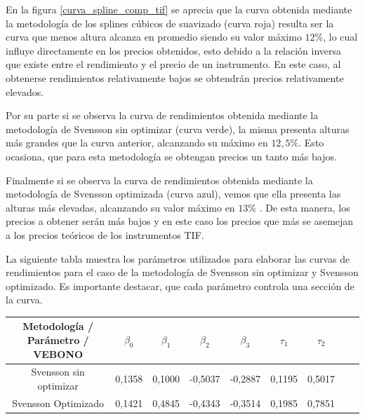 \hspace{0.4cm} En la figura \ref{curva_spline_comp_tif} se aprecia que la curva obtenida mediante la metodolog\'ia de los splines c\'ubicos de suavizado (curva roja) resulta ser la curva que menos altura alcanza en promedio siendo su valor m\'aximo $12 \%$, lo cual influye directamente en los precios obtenidos, esto debido a la relaci\'on inversa que existe entre el rendimiento y el precio de un instrumento. En este caso, al obtenerse rendimientos relativamente bajos se obtendr\'an precios relativamente elevados. 

\hspace{0.4cm} Por su parte si se observa la curva de rendimientos obtenida mediante la metodolog\'ia de Svensson sin optimizar (curva verde), la misma presenta alturas m\'as grandes que la curva anterior, alcanzando su m\'aximo en $12,5 \%$. Esto ocasiona, que para esta metodolog\'ia se obtengan precios un tanto m\'as bajos.

\hspace{0.4cm} Finalmente si se observa la curva de rendimientos obtenida mediante la metodolog\'ia de Svensson optimizada (curva azul), vemos que ella presenta las alturas m\'as elevadas, alcanzando su valor m\'aximo en $13 \%$ . De esta manera, los precios a obtener ser\'an m\'as bajos y en este caso los precios que m\'as se asemejan a los precios te\'oricos de los instrumentos TIF.




\newpage

\hspace{0.4cm} La siguiente tabla muestra los par\'ametros utilizados para elaborar las curvas de rendimientos para el caso de la metodolog\'ia de Svensson sin optimizar y Svensson optimizado. Es importante destacar, que cada par\'ametro controla una secci\'on de la curva.


{\begin{tabular}[t]{|c |c |c |c |c |c |c |c |r|}
\hline
Metodolog\'ia / Par\'ametro / VEBONO & $\beta_{0}$ & $\beta_{1}$ & $\beta_{2}$ & $\beta_{3}$  &  $\tau_{1}$ & $\tau_{2}$ \\
\hline
Svensson sin optimizar & 0,1358 & 0,1000 & -0,5037 & -0,2887 & 0,1195 & 0,5017\\
\hline
Svensson Optimizado & 0,1421 & 0,4845 & -0,4343 & -0,3514 & 0,1985 & 0,7851 \\
\hline
\end{tabular}}

\vspace{0.5cm}

